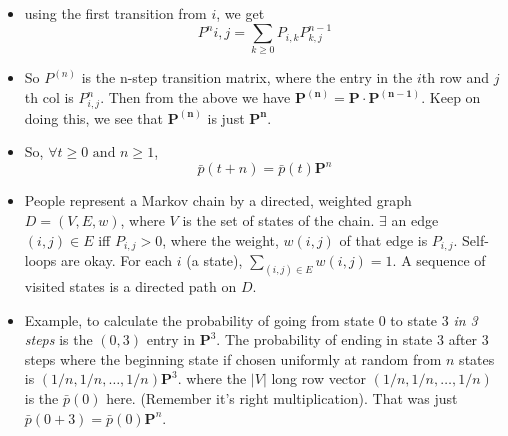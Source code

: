 \documentclass[10pt]{article}
\newcounter{set}
\begin{document}
\begin{itemize}
\item using the first transition from $i$, we get $$P^n{i,j} = \sum_{k\ge 0} P_{i, k}P^{n-1}_{k,j}$$
\item So $P^{(n)}$ is the n-step transition matrix, where the entry in the $i$th row and $j$th col is $P^n_{i,j}$. Then from the above we have $\mathbf{P^{(n)}} = \mathbf{P}\cdot \mathbf{P^{(n-1)}}$. Keep on doing this, we see that $\mathbf{P^{(n)}}$ is just $\mathbf{P^n}$.
\item So, $\forall t\ge 0 \text{ and } n \ge 1$, $$\bar{p}(t+n) = \bar{p}(t)\mathbf{P}^n$$

\item People represent a Markov chain by a directed, weighted graph $D=(V, E, w)$, where $V$ is the set of states of the chain. $\exists$ an edge $(i,j)\in E$ iff $P_{i,j} > 0$, where the weight, $w(i,j)$ of that edge is $P_{i,j}$. Self-loops are okay. For each $i$ (a state), $\sum_{(i,j) \in E} w(i,j) = 1$. A sequence of visited states is a directed path on $D$.
\item Example, to calculate the probability of going from state 0 to state 3 \emph{in 3 steps} is the $(0,3)$ entry in $\mathbf{P}^3$. The probability of ending in state 3 after 3 steps where the beginning state if chosen uniformly at random from $n$ states is $(1/n, 1/n, \dots, 1/n)\mathbf{P}^3$. where the $|V|$ long row vector $(1/n, 1/n, \dots, 1/n)$ is the $\bar{p}(0)$ here. (Remember it's right multiplication). That was just $\bar{p}(0+3) = \bar{p}(0)\mathbf{P}^n$.
\end{itemize}
\end{document}
